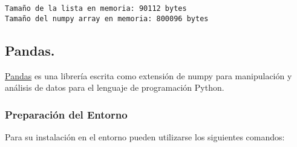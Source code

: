 \documentclass[11pt]{article}
\begin{document}
    \begin{Verbatim}[commandchars=\\\{\}]
Tamaño de la lista en memoria: 90112 bytes
Tamaño del numpy array en memoria: 800096 bytes

    \end{Verbatim}

    \subsection{Pandas.}\label{pandas.}

\href{https://pandas.pydata.org/}{Pandas} es una librería escrita como
extensión de numpy para manipulación y análisis de datos para el
lenguaje de programación Python.

\subsubsection{Preparación del
Entorno}\label{preparaciuxf3n-del-entorno}

Para su instalación en el entorno pueden utilizarse los siguientes
comandos:
\end{document}

